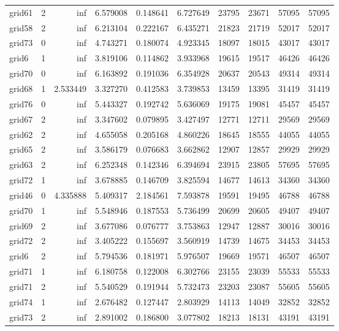 \begin{longtable}{|l|r|r|r|r|r|r|r|r|r|}
grid61 & 2 & inf & 6.579008 & 0.148641 & 6.727649 & 23795 & 23671 & 57095 & 57095 \\
grid58 & 2 & inf & 6.213104 & 0.222167 & 6.435271 & 21823 & 21719 & 52017 & 52017 \\
grid73 & 0 & inf & 4.743271 & 0.180074 & 4.923345 & 18097 & 18015 & 43017 & 43017 \\
grid6 & 1 & inf & 3.819106 & 0.114862 & 3.933968 & 19615 & 19517 & 46426 & 46426 \\
grid70 & 0 & inf & 6.163892 & 0.191036 & 6.354928 & 20637 & 20543 & 49314 & 49314 \\
grid68 & 1 & 2.533449 & 3.327270 & 0.412583 & 3.739853 & 13459 & 13395 & 31419 & 31419 \\
grid76 & 0 & inf & 5.443327 & 0.192742 & 5.636069 & 19175 & 19081 & 45457 & 45457 \\
grid67 & 2 & inf & 3.347602 & 0.079895 & 3.427497 & 12771 & 12711 & 29569 & 29569 \\
grid62 & 2 & inf & 4.655058 & 0.205168 & 4.860226 & 18645 & 18555 & 44055 & 44055 \\
grid65 & 2 & inf & 3.586179 & 0.076683 & 3.662862 & 12907 & 12857 & 29929 & 29929 \\
grid63 & 2 & inf & 6.252348 & 0.142346 & 6.394694 & 23915 & 23805 & 57695 & 57695 \\
grid72 & 1 & inf & 3.678885 & 0.146709 & 3.825594 & 14677 & 14613 & 34360 & 34360 \\
grid46 & 0 & 4.335888 & 5.409317 & 2.184561 & 7.593878 & 19591 & 19495 & 46788 & 46788 \\
grid70 & 1 & inf & 5.548946 & 0.187553 & 5.736499 & 20699 & 20605 & 49407 & 49407 \\
grid69 & 2 & inf & 3.677086 & 0.076777 & 3.753863 & 12947 & 12887 & 30016 & 30016 \\
grid72 & 2 & inf & 3.405222 & 0.155697 & 3.560919 & 14739 & 14675 & 34453 & 34453 \\
grid6 & 2 & inf & 5.794536 & 0.181971 & 5.976507 & 19669 & 19571 & 46507 & 46507 \\
grid71 & 1 & inf & 6.180758 & 0.122008 & 6.302766 & 23155 & 23039 & 55533 & 55533 \\
grid71 & 2 & inf & 5.540529 & 0.191944 & 5.732473 & 23203 & 23087 & 55605 & 55605 \\
grid74 & 1 & inf & 2.676482 & 0.127447 & 2.803929 & 14113 & 14049 & 32852 & 32852 \\
grid73 & 2 & inf & 2.891002 & 0.186800 & 3.077802 & 18213 & 18131 & 43191 & 43191 \\

\end{longtable}
